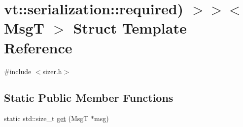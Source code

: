 \hypertarget{structvt_1_1serialization_1_1_msg_sizer_3_01_msg_t_00_01typename_01std_1_1enable__if__t_3_01true765b7ed5f37ccd7e70aee4400f6390bc}{}\section{vt\+:\+:serialization\+:\+:required) $>$$>$$<$ MsgT $>$ Struct Template Reference}
\label{structvt_1_1serialization_1_1_msg_sizer_3_01_msg_t_00_01typename_01std_1_1enable__if__t_3_01true765b7ed5f37ccd7e70aee4400f6390bc}


{\ttfamily \#include $<$sizer.\+h$>$}

\subsection*{Static Public Member Functions}
\begin{DoxyCompactItemize}
\item 
static std\+::size\+\_\+t \hyperlink{structvt_1_1serialization_1_1_msg_sizer_3_01_msg_t_00_01typename_01std_1_1enable__if__t_3_01true765b7ed5f37ccd7e70aee4400f6390bc_af0dd0212305e938e154d12f6cde3cb4b}{get} (MsgT $\ast$msg)
\end{DoxyCompactItemize}


